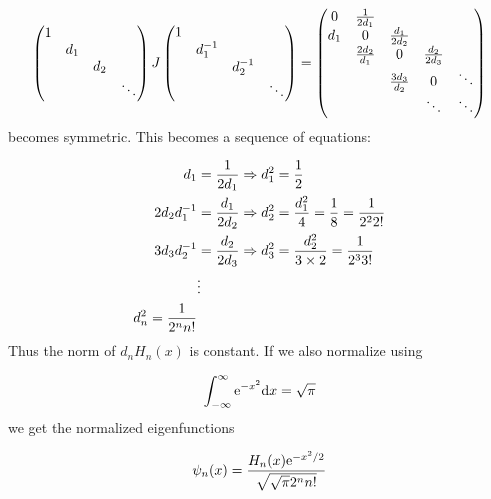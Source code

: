 \documentclass[12pt,landscape]{article}
\def\D{ {\rm d} }
\def\E{ {\rm e} }
\def\dx{\D x}
\begin{document}
{\[
\begin{pmatrix}1 \\ & d_1 \\ &&d_2 \\&&&\ddots \end{pmatrix}  J \begin{pmatrix}1 \\ & d_1^{-1} \\ &&d_2^{-1} \\&&&\ddots \end{pmatrix} = \begin{pmatrix} 0 & {1 \over 2d_1} \\
d_1 & 0 & {d_1 \over 2 d_2} \\
& {2d_2 \over d_1} & 0 & {d_2 \over 2 d_3} \\
&& {3d_3 \over d_2} & 0 & \ddots \\
&&& \ddots & \ddots
\end{pmatrix}
\]
becomes symmetric. This becomes a sequence of equations:


\begin{align*}
d_1 &= {1 \over 2 d_1} \Rightarrow d_1^2 = {1 \over 2} \\
2d_2d_1^{-1} &= {d_1 \over 2 d_2} \Rightarrow d_2^2 = {d_1^2 \over 4} = {1 \over 8} = {1 \over 2^2 2!} \\
3d_3d_2^{-1} &= {d_2 \over 2 d_3} \Rightarrow d_3^2 = {d_2^2 \over 3\times 2} = {1 \over 2^3 3!} \\
&\vdots \\
d_n^2 = {1 \over 2^n n!}
\end{align*}
Thus the norm of $d_n H_n(x)$ is constant. If we also normalize using

\[
    \int_{-\infty}^\infty \E^{-x^2} \dx = \sqrt{\pi}
\]
we get the normalized eigenfunctions

\[
    \psi_n(x) = {H_n(x)\E^{-x^2/2}  \over \sqrt{\sqrt{\pi} 2^n n!} }
\]

}
\end{document}
